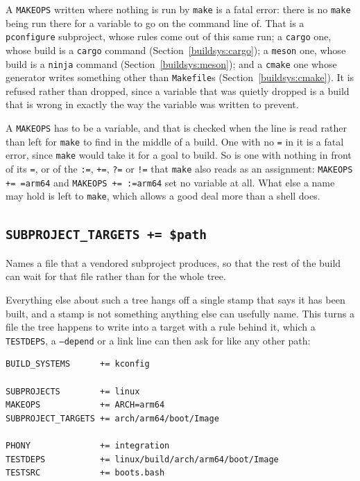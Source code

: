 \documentclass{article}
\begin{document}
A \texttt{MAKEOPS} written where nothing is run by \texttt{make} is a
fatal error: there is no \texttt{make} being run there for a variable
to go on the command line of.  That is a \texttt{pconfigure}
subproject, whose rules come out of this same run; a \texttt{cargo}
one, whose build is a \texttt{cargo} command
(Section~\ref{buildsys:cargo}); a \texttt{meson} one, whose build
is a \texttt{ninja} command (Section~\ref{buildsys:meson}); and a
\texttt{cmake} one whose generator writes something other than
\texttt{Makefile}s (Section~\ref{buildsys:cmake}).  It is refused rather than dropped,
since a variable that was quietly dropped is a build that is wrong in
exactly the way the variable was written to prevent.

A \texttt{MAKEOPS} has to be a variable, and that is checked when the
line is read rather than left for \texttt{make} to find in the middle
of a build.  One with no \texttt{=} in it is a fatal error, since
\texttt{make} would take it for a goal to build.  So is one with
nothing in front of its \texttt{=}, or of the \texttt{:=},
\texttt{+=}, \texttt{?=} or \texttt{!=} that \texttt{make} also reads
as an assignment: \texttt{MAKEOPS += =arm64} and \texttt{MAKEOPS +=
:=arm64} set no variable at all.  What else a name may hold is left to
\texttt{make}, which allows a good deal more than a shell does.

\subsection{\texttt{SUBPROJECT\_TARGETS += \$path}
\label{cmd:subproject_targets}}

Names a file that a vendored subproject produces, so that the rest of
the build can wait for that file rather than for the whole tree.

Everything else about such a tree hangs off a single stamp that says
it has been built, and a stamp is not something anything else can
usefully name.  This turns a file the tree happens to write into a
target with a rule behind it, which a \texttt{TESTDEPS}, a
\texttt{--depend} or a link line can then ask for like any other path:

\begin{verbatim}
BUILD_SYSTEMS      += kconfig

SUBPROJECTS        += linux
MAKEOPS            += ARCH=arm64
SUBPROJECT_TARGETS += arch/arm64/boot/Image

PHONY              += integration
TESTDEPS           += linux/build/arch/arm64/boot/Image
TESTSRC            += boots.bash
\end{verbatim}
\end{document}
